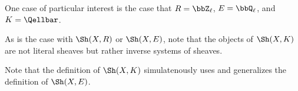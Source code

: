 \begin{definition}
    One case of particular interest is the case that $R = \bbZ_\ell$, $E = \bbQ_\ell$, and $K = \Qellbar$.

    As is the case with $\Sh(X,R)$ or $\Sh(X,E)$, note that the objects of $\Sh(X,K)$ are not literal sheaves but rather inverse systems of sheaves.

    Note that the definition of $\Sh(X,K)$ simulatenously uses and generalizes the definition of $\Sh(X,E)$.

\end{definition}